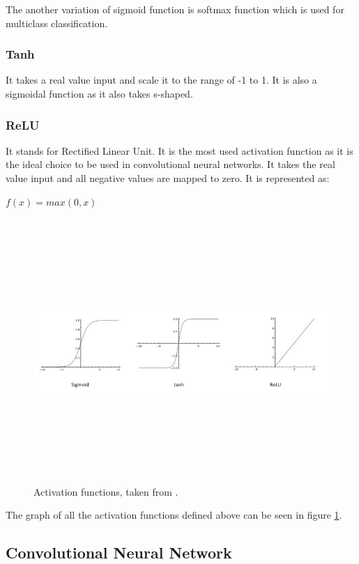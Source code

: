 The another variation of sigmoid function is softmax function which is used for multiclass classification.

\subsubsection{Tanh}
It takes a real value input and scale it to the range of -1 to 1. It is also a sigmoidal function as it also takes s-shaped.


\subsubsection{ReLU}
It stands for Rectified Linear Unit. It is the most used activation function as it is the ideal choice to be used in convolutional neural networks. It takes the real value input and all negative values are mapped to zero. It is represented as:

\begin{center}
$f(x) = max(0, x)$
\end{center}

\begin{figure}[htpb]
	\centering
	\includegraphics[width=15cm,height=10cm,keepaspectratio=true]{images/act-funcs}
	\caption{
		Activation functions, taken from \cite{ujjwalkarn}.
	}
	\label{fig:funcs}
\end{figure}

The graph of all the activation functions defined above can be seen in figure \ref{fig:funcs}.

\subsection{Convolutional Neural Network}